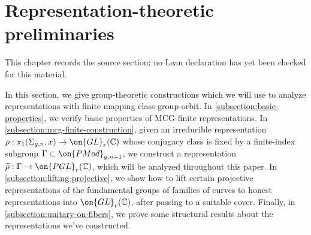 \chapter{Representation-theoretic preliminaries}
\label{canonical-representations-surface-groups-chapter-02}

\begin{remark}
\label{canonical-representations-surface-groups-chapter-02-source}
This chapter records the source section; no Lean declaration has yet been checked for this material.
\notready
\end{remark}

\label{section:representation-preliminaries}

In this section, we give group-theoretic constructions which we will use to
analyze representations with finite mapping class group orbit.
In \autoref{subsection:basic-properties},
we verify basic properties of MCG-finite representations.
In \autoref{subsection:mcg-finite-construction}, given an irreducible representation
$\rho: \pi_1(\Sigma_{g,n},x) \to \on{GL}_r(\mathbb C)$ whose conjugacy class is fixed by a finite-index subgroup $\Gamma\subset\on{PMod}_{g,n+1}$, we construct a representation
$\widetilde{\rho}:  \Gamma \to \on{PGL}_r(\mathbb C)$,
which will be analyzed throughout this paper.
In \autoref{subsection:lifting-projective},
we show how to lift certain projective representations of the fundamental groups of families of curves to honest representations into
$\on{GL}_r(\mathbb C)$,
after passing to a suitable cover. Finally, in
\autoref{subsection:unitary-on-fibers}, we prove some structural results about the representations we've constructed.

